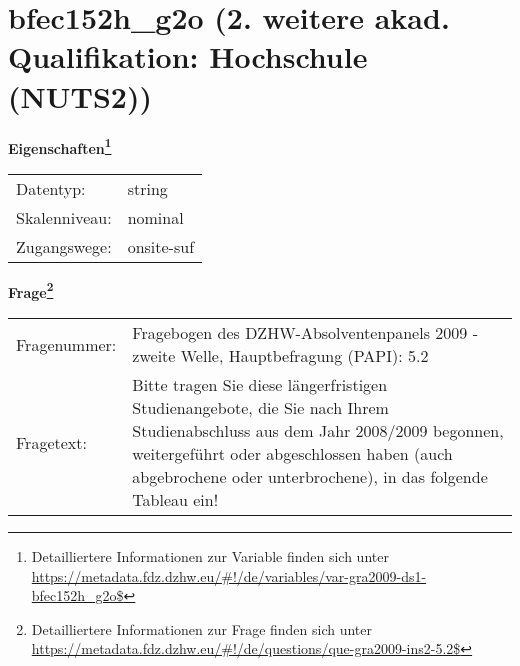 
    \setcounter{footnote}{0}

    \vspace*{-1.8cm}
	\section{bfec152h\_g2o (2. weitere akad. Qualifikation: Hochschule (NUTS2))}
	\label{section:bfec152h_g2o}



    \vspace*{0.5cm}
    \noindent\textbf{Eigenschaften\footnote{Detailliertere Informationen zur Variable finden sich unter
		\url{https://metadata.fdz.dzhw.eu/\#!/de/variables/var-gra2009-ds1-bfec152h_g2o$}}}\\
	\begin{tabularx}{\hsize}{@{}lX}
	Datentyp: & string \\
	Skalenniveau: & nominal \\
	Zugangswege: &
	  onsite-suf
 \\
    \end{tabularx}



				\vspace*{0.5cm}
                \noindent\textbf{Frage\footnote{Detailliertere Informationen zur Frage finden sich unter
		              \url{https://metadata.fdz.dzhw.eu/\#!/de/questions/que-gra2009-ins2-5.2$}}}\\
				\begin{tabularx}{\hsize}{@{}lX}
					Fragenummer: &
					  Fragebogen des DZHW-Absolventenpanels 2009 - zweite Welle, Hauptbefragung (PAPI):
					  5.2
 \\
					Fragetext: & Bitte tragen Sie diese längerfristigen Studienangebote, die Sie nach Ihrem Studienabschluss aus dem Jahr 2008/2009 begonnen, weitergeführt oder abgeschlossen haben (auch abgebrochene oder unterbrochene), in das folgende Tableau ein! \\
				\end{tabularx}





